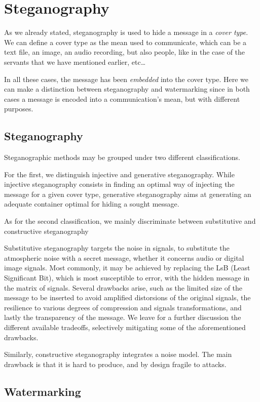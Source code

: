 \documentclass[../../main.tex]{subfiles}
\begin{document}
\section{Steganography}

As we already stated, steganography is used to hide a message in a
\emph{cover type}. We can define a cover type as the mean used to communicate,
which can be a text file, an image, an audio recording, but also people, like in
the case of the servants that we have mentioned earlier, etc\dots

In all these cases, the message has been \emph{embedded} into the cover type.
Here we can make a distinction between steganography and watermarking since in
both cases a message is encoded into a communication's mean, but with different
purposes.

\subsection{Steganography}

Steganographic methods may be grouped under two different classifications.

For the first, we distinguish injective and generative steganography.
While injective steganography consists in finding an optimal way of injecting the message for a given cover type, generative steganography aims at generating an adequate container optimal for hiding a sought message.

As for the second classification, we mainly discriminate between substitutive and constructive steganography

Substitutive steganography targets the noise in signals, to substitute the atmospheric noise with a secret message, whether it concerns audio or digital image signals. Most commonly, it may be achieved by replacing the LsB (Least Significant Bit), which is most susceptible to error, with the hidden message in the matrix of signals.  Several drawbacks arise, such as the limited size of the message to be inserted to avoid amplified distorsions of the original signals, the resilience to various degrees of compression and signals transformations, and lastly the transparency of the message.
We leave for a further discussion the different available tradeoffs, selectively mitigating some of the aforementioned drawbacks. 

Similarly, constructive steganography integrates a noise model. The main drawback is that it is hard to produce, and by design fragile to attacks.

\subsection{Watermarking}

\pagebreak
\end{document}
